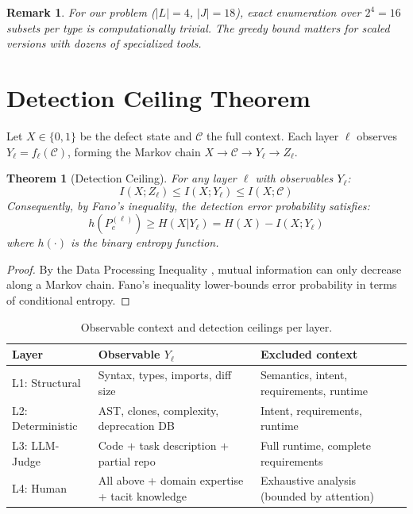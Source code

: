 \documentclass[11pt, a4paper, copyright]{googledeepmind}
\newtheorem{theorem}{Theorem}[section]
\newtheorem*{remark}{Remark}
\begin{document}
\begin{remark}
For our problem ($|L| = 4$, $|J| = 18$), exact enumeration over $2^4 = 16$ subsets per type is computationally trivial. The greedy bound matters for scaled versions with dozens of specialized tools.
\end{remark}


\section{Detection Ceiling Theorem}
\label{sec:ceilings}

Let $X \in \{0,1\}$ be the defect state and $\mathcal{C}$ the full context. Each layer $\ell$ observes $Y_\ell = f_\ell(\mathcal{C})$, forming the Markov chain $X \to \mathcal{C} \to Y_\ell \to Z_\ell$.

\begin{theorem}[Detection Ceiling]
\label{thm:ceiling}
For any layer $\ell$ with observables $Y_\ell$:
\begin{equation}
I(X; Z_\ell) \leq I(X; Y_\ell) \leq I(X; \mathcal{C})
\end{equation}
Consequently, by Fano's inequality, the detection error probability satisfies:
\begin{equation}
h(P_e^{(\ell)}) \geq H(X | Y_\ell) = H(X) - I(X; Y_\ell)
\end{equation}
where $h(\cdot)$ is the binary entropy function.
\end{theorem}

\begin{proof}
By the Data Processing Inequality \citep{coverthomas2006}, mutual information can only decrease along a Markov chain. Fano's inequality lower-bounds error probability in terms of conditional entropy.
\end{proof}

\begin{table}[htbp]
\centering
\caption{Observable context and detection ceilings per layer.}
\label{tab:ceilings}
\small
\begin{tabularx}{\textwidth}{l X X}
\toprule
\textbf{Layer} & \textbf{Observable $Y_\ell$} & \textbf{Excluded context} \\
\midrule
L1: Structural & Syntax, types, imports, diff size & Semantics, intent, requirements, runtime \\
L2: Deterministic & AST, clones, complexity, deprecation DB & Intent, requirements, runtime \\
L3: LLM-Judge & Code + task description + partial repo & Full runtime, complete requirements \\
L4: Human & All above + domain expertise + tacit knowledge & Exhaustive analysis (bounded by attention) \\
\bottomrule
\end{tabularx}
\end{table}
\end{document}
